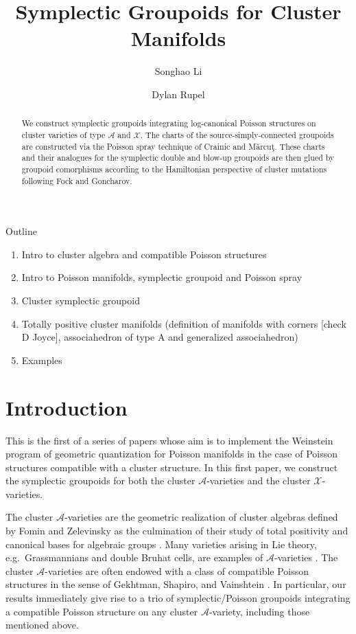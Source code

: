 \documentclass{amsart}
\title{Symplectic Groupoids for Cluster Manifolds}
\author{Songhao Li}
\author{Dylan Rupel}
\numberwithin{equation}{section}
\newcommand{\cA}{\mathcal{A}}
\newcommand{\cX}{\mathcal{X}}
\begin{document}
\begin{abstract}
  We construct symplectic groupoids integrating log-canonical Poisson structures on cluster varieties of type $\cA$ and $\cX$.
  The charts of the source-simply-connected groupoids are constructed via the Poisson spray technique of Crainic and M\u{a}rcu\c{t}.
  These charts and their analogues for the symplectic double and blow-up groupoids are then glued by groupoid comorphisms according to the Hamiltonian perspective of cluster mutations following Fock and Goncharov.
\end{abstract}
\maketitle
Outline
\begin{enumerate}
	\item Intro to cluster algebra and compatible Poisson structures 
	\item Intro to Poisson manifolds, symplectic groupoid and Poisson spray
	\item Cluster symplectic groupoid
	\item Totally positive cluster manifolds (definition of manifolds with corners [check D Joyce], associahedron of type A and generalized associahedron)
	\item Examples
\end{enumerate}

\section{Introduction}
This is the first of a series of papers whose aim is to implement the Weinstein program of geometric quantization for Poisson manifolds \cite{Wei91} in the case of Poisson structures compatible with a cluster structure.
In this first paper, we construct the symplectic groupoids for both the cluster $\cA$-varieties and the cluster $\cX$-varieties. 

The cluster $\cA$-varieties are the geometric realization of cluster algebras defined by Fomin and Zelevinsky \cite{FZ02} as the culmination of their study of total positivity and canonical bases for algebraic groups \cite{BFZ96,FZ99}.
Many varieties arising in Lie theory, e.g.\ Grassmannians and double Bruhat cells, are examples of $\cA$-varieties \cite{BFZ05,Sco06,GSV03,Wil13b}.
The cluster $\cA$-varieties are often endowed with a class of compatible Poisson structures in the sense of Gekhtman, Shapiro, and Vainshtein \cite{GSV10}.
In particular, our results immediately give rise to a trio of symplectic/Poisson groupoids integrating a compatible Poisson structure on any cluster $\cA$-variety, including those mentioned above. 
\end{document}
